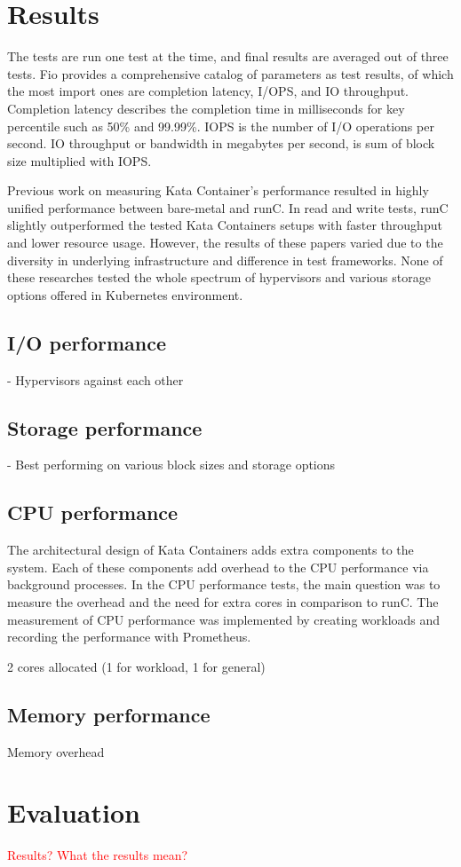\section{Results}

The tests are run one test at the time, and final results are averaged out of three tests. Fio provides a comprehensive catalog of parameters as test results, of which the most import ones are completion latency, I/OPS, and IO throughput. Completion latency describes the completion time in milliseconds for key percentile such as 50\% and 99.99\%. IOPS is the number of I/O operations per second. IO throughput or bandwidth in megabytes per second, is sum of block size multiplied with IOPS.

Previous work \cite{EverartsdeVelp2020}\cite{Kumar2020}\cite{StackHPCKata}\cite{Randazzo2019} on measuring Kata Container's performance resulted in highly unified performance between bare-metal and runC. In read and write tests, runC slightly outperformed the tested Kata Containers setups with faster throughput and lower resource usage. However, the results of these papers varied due to the diversity in underlying infrastructure and difference in test frameworks. None of these researches tested the whole spectrum of hypervisors and various storage options offered in Kubernetes environment.

\subsection{I/O performance}

- Hypervisors against each other

\subsection{Storage performance}

- Best performing on various block sizes and storage options

\subsection{CPU performance}

The architectural design of Kata Containers adds extra components to the system. Each of these components add overhead to the CPU performance via background processes. In the CPU performance tests, the main question was to measure the overhead and the need for extra cores in comparison to runC. The measurement of CPU performance was implemented by creating workloads and recording the performance with Prometheus. 

2 cores allocated (1 for workload, 1 for general)

\subsection{Memory performance}

Memory overhead

\section{Evaluation}

\textcolor{red}{Results?}
\textcolor{red}{What the results mean?}